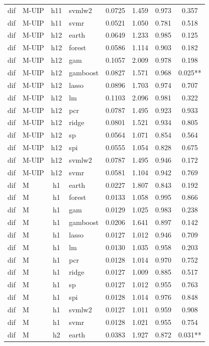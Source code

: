 \begin{ThreePartTable}
\begin{longtable}[t]{llclcccc}
dif & M-UIP & h11 & svmlw2 & 0.0725 & 1.459 & 0.973 & 0.357\\
dif & M-UIP & h11 & svmr & 0.0521 & 1.050 & 0.781 & 0.518\\
\addlinespace
dif & M-UIP & h12 & earth & 0.0649 & 1.233 & 0.985 & 0.125\\
dif & M-UIP & h12 & forest & 0.0586 & 1.114 & 0.903 & 0.182\\
dif & M-UIP & h12 & gam & 0.1057 & 2.009 & 0.978 & 0.198\\
dif & M-UIP & h12 & gamboost & 0.0827 & 1.571 & 0.968 & 0.025**\\
dif & M-UIP & h12 & lasso & 0.0896 & 1.703 & 0.974 & 0.707\\
dif & M-UIP & h12 & lm & 0.1103 & 2.096 & 0.981 & 0.322\\
dif & M-UIP & h12 & pcr & 0.0787 & 1.495 & 0.923 & 0.933\\
dif & M-UIP & h12 & ridge & 0.0801 & 1.521 & 0.934 & 0.805\\
dif & M-UIP & h12 & sp & 0.0564 & 1.071 & 0.854 & 0.564\\
dif & M-UIP & h12 & spi & 0.0555 & 1.054 & 0.828 & 0.675\\
dif & M-UIP & h12 & svmlw2 & 0.0787 & 1.495 & 0.946 & 0.172\\
dif & M-UIP & h12 & svmr & 0.0581 & 1.104 & 0.942 & 0.769\\
\addlinespace
dif & M & h1 & earth & 0.0227 & 1.807 & 0.843 & 0.192\\
dif & M & h1 & forest & 0.0133 & 1.058 & 0.995 & 0.866\\
dif & M & h1 & gam & 0.0129 & 1.025 & 0.983 & 0.238\\
dif & M & h1 & gamboost & 0.0206 & 1.641 & 0.897 & 0.142\\
dif & M & h1 & lasso & 0.0127 & 1.012 & 0.946 & 0.709\\
dif & M & h1 & lm & 0.0130 & 1.035 & 0.958 & 0.203\\
dif & M & h1 & pcr & 0.0128 & 1.014 & 0.970 & 0.752\\
dif & M & h1 & ridge & 0.0127 & 1.009 & 0.885 & 0.517\\
dif & M & h1 & sp & 0.0127 & 1.012 & 0.955 & 0.763\\
dif & M & h1 & spi & 0.0128 & 1.014 & 0.976 & 0.848\\
dif & M & h1 & svmlw2 & 0.0127 & 1.011 & 0.959 & 0.908\\
dif & M & h1 & svmr & 0.0128 & 1.021 & 0.955 & 0.754\\
\addlinespace
dif & M & h2 & earth & 0.0383 & 1.927 & 0.872 & 0.031**\\

\end{longtable}
\end{ThreePartTable}
